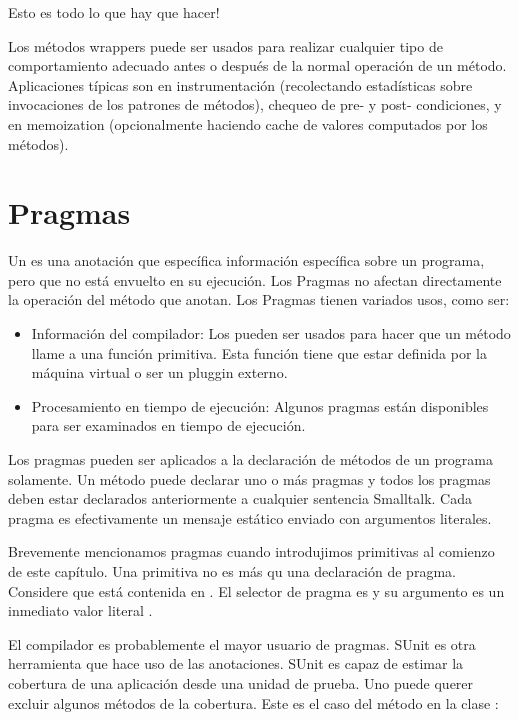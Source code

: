 \documentclass[a4paper,10pt,twoside]{book}
\begin{document}
Esto es todo lo que hay que hacer!

Los m\'etodos wrappers puede ser usados para realizar cualquier tipo de comportamiento adecuado antes o despu\'es de la normal operaci\'on de un m\'etodo. Aplicaciones t\'ipicas son en instrumentaci\'on (recolectando estad\'isticas sobre invocaciones de los patrones de m\'etodos), chequeo de pre- y post- condiciones,
y en memoization (opcionalmente haciendo cache de valores computados por los m\'etodos).

\section{Pragmas}

Un  es una anotaci\'on que espec\'ifica informaci\'on espec\'ifica sobre un programa, pero que no est\'a envuelto en su ejecuci\'on. Los Pragmas no afectan directamente la operaci\'on del m\'etodo que anotan. Los Pragmas tienen variados usos, como ser:

\begin{itemize}
\item Informaci\'on del compilador: Los  pueden ser usados para hacer que un m\'etodo llame a una funci\'on primitiva. Esta funci\'on tiene que estar definida por la m\'aquina virtual o ser un pluggin externo.

\item Procesamiento en tiempo de ejecuci\'on: Algunos pragmas est\'an disponibles para ser examinados en tiempo de ejecuci\'on.
\end{itemize}

Los pragmas pueden ser aplicados a la declaraci\'on de m\'etodos de un programa solamente. Un m\'etodo puede declarar uno o m\'as pragmas y todos los pragmas deben estar declarados anteriormente a cualquier sentencia Smalltalk. Cada pragma es efectivamente un mensaje est\'atico enviado con argumentos literales.

Brevemente mencionamos pragmas cuando introdujimos primitivas al comienzo de este cap\'itulo. Una primitiva no es m\'as qu una declaraci\'on de pragma. Considere  que est\'a contenida en . El selector de pragma es  y su argumento es un inmediato valor literal .

El compilador es probablemente el mayor usuario de pragmas. SUnit es otra herramienta que hace uso de las anotaciones. SUnit es capaz de estimar la cobertura de una aplicaci\'on desde una unidad de prueba. Uno puede querer excluir algunos m\'etodos de la cobertura. Este es el caso del m\'etodo  en la clase :  
\end{document}
